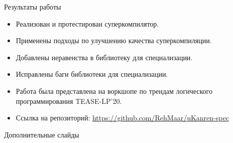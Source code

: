 \documentclass[xcolor=table]{beamer}
\begin{document}
%
\begin{frame}{Результаты работы}
  \begin{itemize}
  \item Реализован и протестирован суперкомпилятор.
  \item Применены подходы по улучшению качества суперкомпиляции.
  \item Добавлены неравенства в библиотеку для специализации.
  \item Исправлены баги библиотеки для специализации.
\item Работа была представлена на воркшопе по трендам логического программирования TEASE-LP'20.
\item Ссылка на репозиторий: \url{https://github.com/RehMaar/uKanren-spec}
  \end{itemize}
\end{frame}



\appendix
\begin{frame}[plain]
\center
{\large Дополнительные слайды}
\end{frame}
\end{document}
